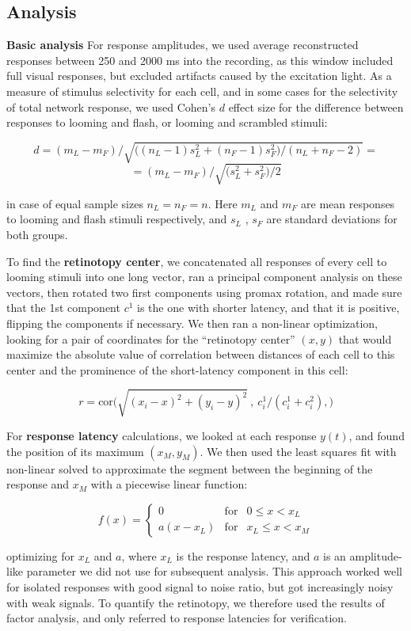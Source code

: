 \documentclass{article}
\begin{document}
\subsection*{Analysis}

\textbf{Basic analysis} For response amplitudes, we used average reconstructed responses between 250 and 2000 ms into the recording, as this window included full visual responses, but excluded artifacts caused by the excitation light. As a measure of stimulus selectivity for each cell, and in some cases for the selectivity of total network response, we used Cohen’s $d$ effect size for the difference between responses to looming and flash, or looming and scrambled stimuli:

\[ d = (m_L-m_F)/ \sqrt{ \big((n_L-1) s^2_L + (n_F-1) s^2_F)/(n_L + n_F - 2)} = \]
\[ =(m_L-m_F)/\sqrt{\big(s^2_L+s^2_F\big)/2} \]

in case of equal sample sizes $n_L=n_F=n$. Here $m_L$ and $m_F$ are mean responses to looming and flash stimuli respectively, and $s_L$ , $s_F$ are standard deviations for both groups.

To find the \textbf{retinotopy center}, we concatenated all responses of every cell to looming stimuli into one long vector, ran a principal component analysis on these vectors, then rotated two first components using promax rotation, and made sure that the 1st component $c^1$ is the one with shorter latency, and that it is positive, flipping the components if necessary. We then ran a non-linear optimization, looking for a pair of coordinates for the “retinotopy center” $(x,y)$ that would maximize the absolute value of correlation between distances of each cell to this center and the prominence of the short-latency component in this cell:

\[ r = \text{cor}\big(\sqrt{(x_i-x)^2+(y_i-y)^2}\ ,\ c^1_i/(c^1_i + c^2_i), \big) \]

For \textbf{response latency} calculations, we looked at each response $y(t)$, and found the position of its maximum $(x_M, y_M)$. We then used the least squares fit with non-linear solved to approximate the segment between the beginning of the response and $x_M$ with a piecewise linear function:

\[ f(x) = \left \{ \begin{array}{cll} 0 & \text{for} & 0 \leqslant x<x_L \\
a (x-x_L) & \text{for} & x_L\leqslant x < x_M \end{array} \right. \]

optimizing for $x_L$ and $a$, where $x_L$ is the response latency, and $a$ is an amplitude-like parameter we did not use for subsequent analysis. This approach worked well for isolated responses with good signal to noise ratio, but got increasingly noisy with weak signals. To quantify the retinotopy, we therefore used the results of factor analysis, and only referred to response latencies for verification.
\end{document}
